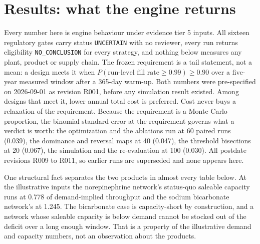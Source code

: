 \section{Results: what the engine returns}
\label{sec:results}

Every number here is engine behaviour under evidence tier 5 inputs. All sixteen regulatory gates
carry status \texttt{UNCERTAIN} with no reviewer, every run returns eligibility
\texttt{NO\_CONCLUSION} for every strategy, and nothing below measures any plant, product or
supply chain. The frozen requirement is a tail statement, not a mean: a design meets it when
$P(\text{run-level fill rate} \ge 0.99) \ge 0.90$ over a five-year measured window after a
365-day warm-up. Both numbers were pre-specified on 2026-09-01 as revision R001, before any
simulation result existed. Among designs that meet it, lower annual total cost is preferred.
Cost never buys a relaxation of the requirement. Because the requirement is a Monte Carlo
proportion, the binomial standard error at the requirement governs what a verdict is worth: the
optimization and the ablations run at 60 paired runs (0.039), the dominance and reversal maps at
40 (0.047), the threshold bisections at 20 (0.067), the simulation and the re-evaluation at 100
(0.030). All postdate revisions R009 to R011, so earlier runs are superseded and none appears
here.

One structural fact separates the two products in almost every table below. At the illustrative
inputs the norepinephrine network's status-quo saleable capacity runs at 0.778 of demand-implied
throughput and the sodium bicarbonate network's at 1.245. The bicarbonate case is capacity-short
by construction, and a network whose saleable capacity is below demand cannot be stocked out of
the deficit over a long enough window. That is a property of the illustrative demand and capacity
numbers, not an observation about the products.

